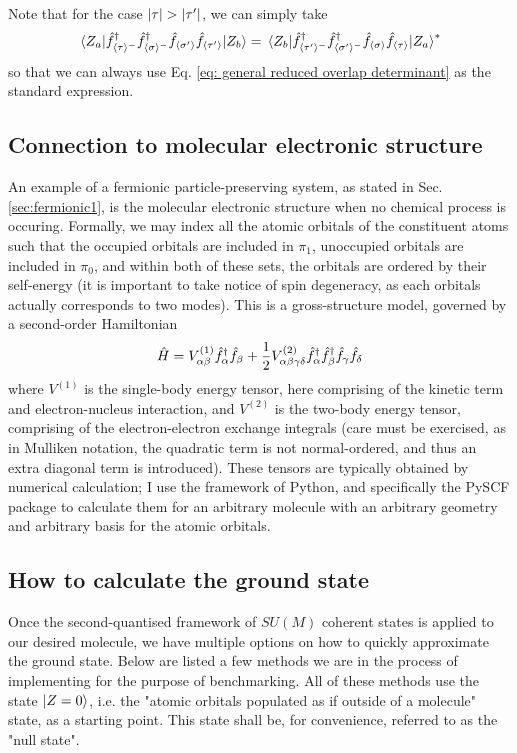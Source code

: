 	Note that for the case $\abs{\tau}>\abs{\tau'}$, we can simply take
	\begin{equation}
	\mel{Z_a}{\hat{f}^\dagger_{\langle \tau\rangle^-}\hat{f}^\dagger_{\langle \sigma\rangle^-}\hat{f}_{\langle \sigma'\rangle}\hat{f}_{\langle \tau'\rangle}}{Z_b}=\mel{Z_b}{\hat{f}^\dagger_{\langle \tau'\rangle^-}\hat{f}^\dagger_{\langle \sigma'\rangle^-}\hat{f}_{\langle \sigma\rangle}\hat{f}_{\langle \tau\rangle}}{Z_a}^*
	\end{equation}
	so that we can always use Eq. \ref{eq: general reduced overlap determinant} as the standard expression.

\subsection{Connection to molecular electronic structure}
An example of a fermionic particle-preserving system, as stated in Sec. \ref{sec:fermionic1}, is the molecular electronic structure when no chemical process is occuring. Formally, we may index all the atomic orbitals of the constituent atoms such that the occupied orbitals are included in $\pi_1$, unoccupied orbitals are included in $\pi_0$, and within both of these sets, the orbitals are ordered by their self-energy (it is important to take notice of spin degeneracy, as each orbitals actually corresponds to two modes). This is a gross-structure model, governed by a second-order Hamiltonian
\begin{equation}
\hat{H}=V^{(1)}_{\alpha\beta}\hat{f}^\dagger_\alpha\hat{f}_\beta+\frac{1}{2}V^{(2)}_{\alpha\beta\gamma\delta}\hat{f}^\dagger_\alpha\hat{f}^\dagger_\beta\hat{f}_\gamma\hat{f}_\delta
\end{equation}
where $V^{(1)}$ is the single-body energy tensor, here comprising of the kinetic term and electron-nucleus interaction, and $V^{(2)}$ is the two-body energy tensor, comprising of the electron-electron exchange integrals (care must be exercised, as in Mulliken notation, the quadratic term is not normal-ordered, and thus an extra diagonal term is introduced). These tensors are typically obtained by numerical calculation; I use the framework of Python, and specifically the PySCF package to calculate them for an arbitrary molecule with an arbitrary geometry and arbitrary basis for the atomic orbitals.

\subsection{How to calculate the ground state}
Once the second-quantised framework of $SU(M)$ coherent states is applied to our desired molecule, we have multiple options on how to quickly approximate the ground state. Below are listed a few methods we are in the process of implementing for the purpose of benchmarking. All of these methods use the state $\ket{Z=0}$, i.e. the "atomic orbitals populated as if outside of a molecule" state, as a starting point. This state shall be, for convenience, referred to as the "null state".

